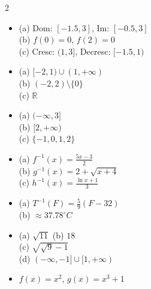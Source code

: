 \documentclass[12pt,a4paper]{article}
\begin{document}
\begin{multicols}{2}
\begin{itemize}

\item[1.] 
(a) Dom: $[-1.5, 3]$, Im: $[-0.5, 3]$ \\
(b) $f(0)=0$, $f(2)=0$ \\
(c) Cresc: $(1, 3]$, Decresc: $[-1.5, 1)$

\item[2.] 
(a) $[-2,1) \cup (1,+\infty)$ \\
(b) $(-2,2)\setminus\{0\}$ \\
(c) $\mathbb{R}$

\item[3.] 
(a) $(-\infty,3]$ \\
(b) $[2,+\infty)$ \\
(c) $\{-1,0,1,2\}$

\item[4.] 
(a) $f^{-1}(x)=\frac{5x-3}{2}$ \\
(b) $g^{-1}(x)=2+\sqrt{x+4}$ \\
(c) $h^{-1}(x)=\frac{\ln x+1}{3}$

\item[5.] 
(a) $T^{-1}(F)=\frac{5}{9}(F-32)$ \\
(b) $\approx 37.78^\circ C$

\item[6.] 
(a) $\sqrt{11}$ \quad (b) $18$ \\
(c) $\sqrt{\sqrt{9}-1}$ \\
(d) $(-\infty,-1]\cup[1,+\infty)$

\item[7.] 
$f(x)=x^2$, $g(x)=x^3+1$

\end{itemize}
\end{multicols}
\end{document}
